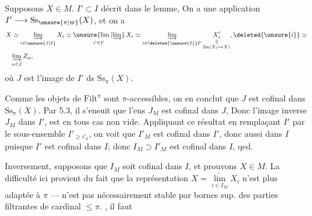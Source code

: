 
Supposons $X\in M$.  
$I'\subset I$  décrit dans le lemme, On a une application
$I'\longrightarrow\mathrm{Ss}_{\unsure{\pi|\varpi}}(X)$,  et on a
\[
\begin{aligned}
 X &\simeq\underset{i\in\unsure{J|I}}{\underrightarrow{\lim}}\,X_i
 \simeq\underset{i'\in I'}{\unsure{\lim|\underrightarrow{\lim}}}\,X_i
 \simeq\underset{i\in\deleted{\unsure{I}}I'}{\underrightarrow{\lim}}\,
 \underset{\substack{\Vert\\ \mathrm{Im}(X_i\hookrightarrow X)}}{X'_i},
 \deleted{\unsure{i}}\simeq\\
 &\underset{\alpha\in J}{\underrightarrow{\lim}}\,Z_\alpha ,
\end{aligned}
\]
où $J$ est l'image de $I'$ ds $\mathrm{Ss}_\pi(X)$.

 Comme les objets de $\mathrm{Filt}^{\pi}$ sont $\pi$-accessibles, on en conclut que $J$ est cofinal dans $\mathrm{Ss}_{\pi}(X)$. Par 5.3, il s'ensuit que l'ens $J_M$ 
est cofinal dans $J$,  Donc  l'image inverse  $J_M$ dans $I'$, est en tous cas non vide.
Appliquant  ce \unsure{$=$|--}résultat en remplaçant $I'$ par le sous-ensemble $I'_{\geq i'_0}$, on voit que $I'_M$ est cofinal dans $I'$, donc aussi dans $I$ puisque $I'$ est cofinal dans $I$; donc $I_M\supset I'_M$ est cofinal dans $I$, qed.

Inversement,  supposons que $I_M$ soit cofinal dans $I$, et prouvons $X\in M$. La difficulté ici provient du fait que la représentation $X=\underset{i\in I_M}{\underrightarrow{\lim}}X_i$ n'est plus adaptée à $\pi$ ---   n'est pas nécessairement stable  par bornes sup.  des parties filtrantes   de cardinal $\leq\pi$. , il faut

